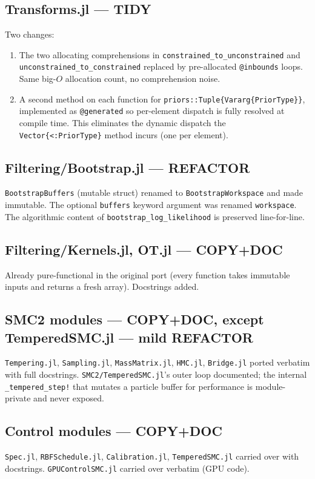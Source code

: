 \documentclass[11pt,a4paper]{article}
\begin{document}
\subsection{Transforms.jl --- TIDY}
Two changes:
\begin{enumerate}[leftmargin=*]
\item The two allocating comprehensions in
\texttt{constrained\_to\_unconstrained} and
\texttt{unconstrained\_to\_constrained} replaced by pre-allocated
\texttt{@inbounds} loops. Same big-$O$ allocation count, no comprehension
noise.
\item A second method on each function for
\texttt{priors::Tuple\{Vararg\{PriorType\}\}}, implemented as
\texttt{@generated} so per-element dispatch is fully resolved at compile
time. This eliminates the dynamic dispatch the
\texttt{Vector\{<:PriorType\}} method incurs (one per element).
\end{enumerate}

\subsection{Filtering/Bootstrap.jl --- REFACTOR}
\texttt{BootstrapBuffers} (mutable struct) renamed to
\texttt{BootstrapWorkspace} and made immutable. The optional
\texttt{buffers} keyword argument was renamed \texttt{workspace}. The
algorithmic content of \texttt{bootstrap\_log\_likelihood} is preserved
line-for-line.

\subsection{Filtering/Kernels.jl, OT.jl --- COPY+DOC}
Already pure-functional in the original port (every function takes
immutable inputs and returns a fresh array). Docstrings added.

\subsection{SMC2 modules --- COPY+DOC, except TemperedSMC.jl --- mild REFACTOR}
\texttt{Tempering.jl}, \texttt{Sampling.jl}, \texttt{MassMatrix.jl},
\texttt{HMC.jl}, \texttt{Bridge.jl} ported verbatim with full docstrings.
\texttt{SMC2/TemperedSMC.jl}'s outer loop documented; the internal
\texttt{\_tempered\_step!} that mutates a particle buffer for performance
is module-private and never exposed.

\subsection{Control modules --- COPY+DOC}
\texttt{Spec.jl}, \texttt{RBFSchedule.jl}, \texttt{Calibration.jl},
\texttt{TemperedSMC.jl} carried over with docstrings.
\texttt{GPUControlSMC.jl} carried over verbatim (GPU code).
\end{document}
